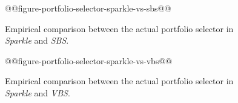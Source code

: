 \documentclass[british]{article}
\begin{document}
\begin{figure}[htbp]
\noindent \begin{centering}
@@figure-portfolio-selector-sparkle-vs-sbs@@
\par\end{centering}

\caption{Empirical comparison between the actual portfolio selector in \emph{Sparkle} and \emph{SBS}.}\label{fig:sparkle_vs_sbs}
\end{figure}

\begin{figure}[htbp]
\noindent \begin{centering}
@@figure-portfolio-selector-sparkle-vs-vbs@@
\par\end{centering}

\caption{Empirical comparison between the actual portfolio selector in \emph{Sparkle} and \emph{VBS}.}\label{fig:sparkle_vs_vbs}
\end{figure}
\fi




\end{document}
